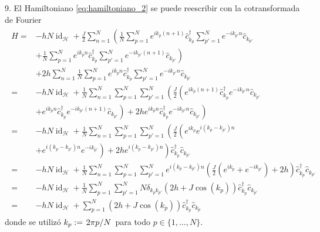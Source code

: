 \documentclass{article}
\DeclareMathOperator{\id}{id}
\begin{document}
9. El Hamiltoniano \eqref{eq:hamiltoniano_2} se puede reescribir con la cotransformada de Fourier
\begin{align}\label{eq:Hamiltoniano_fourier}
\begin{split}
H=&-hN\id_\mathcal{H}+\frac{J}{2}\sum_{n=1}^{N}\left(\frac{1}{N}\sum_{p=1}^{N} e^{ik_p(n+1)}\hat{c}_{k_p}^\dagger\sum_{p'=1}^{N} e^{-ik_{p'}n}\hat{c}_{k_{p'}}\right.\\
&\left.+\frac{1}{N}\sum_{p=1}^{N} e^{ik_pn}\hat{c}_{k_p}^\dagger\sum_{p'=1}^{N} e^{-ik_{p'}(n+1)}\hat{c}_{k_{p'}}\right)\\
&+2h\sum_{n=1}^N\frac{1}{N}\sum_{p=1}^{N} e^{ik_pn}\hat{c}_{k_p}^\dagger\sum_{p'=1}^{N} e^{-ik_{p'}n}\hat{c}_{k_{p'}}\\
=&-hN\id_\mathcal{H}+\frac{1}{N}\sum_{n=1}^{N}\sum_{p=1}^{N}\sum_{p'=1}^{N}\left(\frac{J}{2}\left( e^{ik_p(n+1)}\hat{c}_{k_p}^\dagger e^{-ik_{p'}n}\hat{c}_{k_{p'}}\right.\right.\\
&\left.\left.+e^{ik_pn}\hat{c}_{k_p}^\dagger e^{-ik_{p'}(n+1)}\hat{c}_{k_{p'}}\right)+2h e^{ik_pn}\hat{c}_{k_p}^\dagger e^{-ik_{p'}n}\hat{c}_{k_{p'}}\right)\\
=&-hN\id_\mathcal{H}+\frac{1}{N}\sum_{n=1}^{N}\sum_{p=1}^{N}\sum_{p'=1}^{N}\left(\frac{J}{2}\left( e^{ik_p} e^{i(k_p-k_{p'})n}\right.\right.\\
&\left.\left.+e^{i(k_p-k_{p'})n} e^{-ik_{p'}}\right)+2h e^{i(k_p-k_{p'})n} \right)\hat{c}_{k_p}^\dagger\hat{c}_{k_{p'}}\\
=&-hN\id_\mathcal{H}+\frac{1}{N}\sum_{n=1}^{N}\sum_{p=1}^{N}\sum_{p'=1}^{N}e^{i(k_p-k_{p'})n}\left(\frac{J}{2}\left( e^{ik_p}+ e^{-ik_{p'}}\right)+2h \right)\hat{c}_{k_p}^\dagger\hat{c}_{k_{p'}}\\
=&-hN\id_\mathcal{H}+\frac{1}{N}\sum_{p=1}^{N}\sum_{p'=1}^{N}N\delta_{k_pk_{p'}}\left(2h+J\cos(k_p) \right)\hat{c}_{k_p}^\dagger\hat{c}_{k_{p'}}\\
=&-hN\id_\mathcal{H}+\sum_{p=1}^{N}\left(2h+J\cos(k_p) \right)\hat{c}_{k_p}^\dagger\hat{c}_{k_p}
\end{split}
\end{align}
donde se utilizó $k_p:=\flatfrac{2\pi p}{N}$ para todo $p\in\{1,\dots,N\}$.
\end{document}
